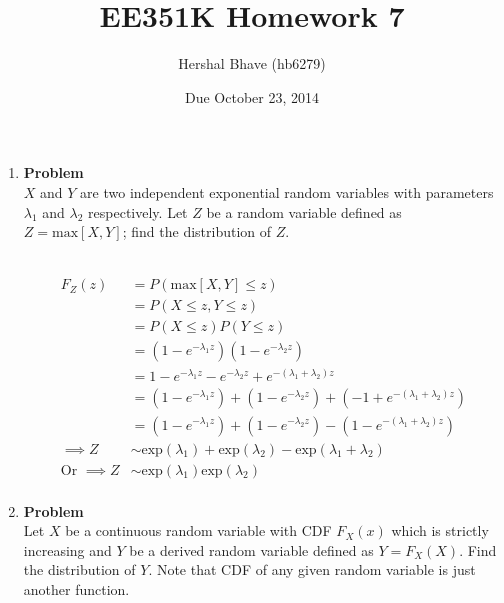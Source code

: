 \documentclass[12pt]{article}
\title{EE351K Homework 7}
\author{Hershal Bhave (hb6279)}
\date{Due October 23, 2014}
\newenvironment{Ex}{\textbf{Problem}\vspace{.75em}\\}{}
\begin{document}
\maketitle
\begin{enumerate}
\item
  \begin{Ex}
    $X$ and $Y$ are two independent exponential random variables with
    parameters $\lambda_1$ and $\lambda_2$ respectively. Let $Z$ be a
    random variable defined as $Z = \text{max}[X,Y]$; find the
    distribution of $Z$.
    \begin{solution} \hfill \vspace{.75em} \\
      \begin{equation}
        \label{eq:1-sol}
        \begin{aligned}
          F_Z(z) &= P(\text{max}[X,Y] \le z) \\
          &= P(X \le z, Y \le z) \\
          &= P(X\le z)P(Y\le z) \\
          &= (1-e^{-\lambda_1 z})(1-e^{-\lambda_2 z}) \\
          &= 1-e^{-\lambda_1 z} - e^{-\lambda_2 z} + e^{-(\lambda_1 +
            \lambda_2) z} \\
          &= (1 - e^{-\lambda_1 z}) + (1 - e^{-\lambda_2 z})+ (-1 +
          e^{-(\lambda_1 + \lambda_2) z}) \\
          &= (1-e^{-\lambda_1 z}) + (1-e^{-\lambda_2 z}) -
          (1-e^{-(\lambda_1 + \lambda_2) z}) \\
          \implies Z &\sim \text{exp}(\lambda_1) + \text{exp}(\lambda_2)
          - \text{exp}(\lambda_1 + \lambda_2) \\
          \text{Or }\implies Z &\sim
          \text{exp}(\lambda_1)\text{exp}(\lambda_2) \\
        \end{aligned}
      \end{equation}
    \end{solution}
  \end{Ex}
\pagebreak[4]
\item
  \begin{Ex}
    Let $X$ be a continuous random variable with CDF $F_X(x)$ which is
    strictly increasing and $Y$ be a derived random variable defined
    as $Y = F_X(X)$. Find the distribution of $Y$.  Note that CDF of
    any given random variable is just another function.
    \begin{solution} \hfill \vspace{.75em} \\

\end{solution}
\end{Ex}
\end{enumerate}
\end{document}
